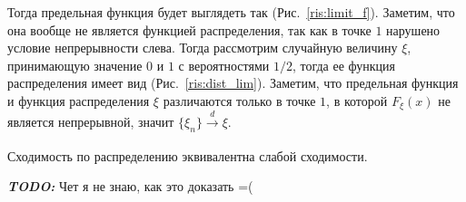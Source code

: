 \documentclass[../TV&MS.tex]{subfiles}
\begin{document}
\begin{Ex}
\begin{center}
\begin{minipage}{0.32\linewidth}
	\begin{center}
	\end{center}
	\label{ris:limit_f}
\end{minipage}
\hspace{0.2cm}
\begin{minipage}{0.32\linewidth}
\begin{center}
\end{center}
\label{ris:dist_lim}
\end{minipage}
\end{center}
\par\bigskip
	Тогда предельная функция будет выглядеть так (Рис.~\ref{ris:limit_f}). Заметим, 
	что она вообще не является функцией распределения, так как в точке $1$ нарушено 
	условие непрерывности слева. Тогда рассмотрим случайную величину $\xi$, 
	принимающую значение $0$ и $1$ с вероятностями $1/2$, тогда ее функция 
	распределения имеет вид (Рис.~\ref{ris:dist_lim}). Заметим, что предельная 
	функция и функция распределения $\xi$ различаются только в точке $1$, в которой 
	$F_\xi(x)$ не является непрерывной, значит $\{\xi_n\} \xrightarrow[]{d} \xi.$
\end{Ex}

\begin{St}
	Сходимость по распределению эквивалентна слабой сходимости.
\end{St}

\begin{Proof}
	\emph{\textbf{TODO:}} Чет я не знаю, как это доказать =(
\end{Proof}
\end{document}
